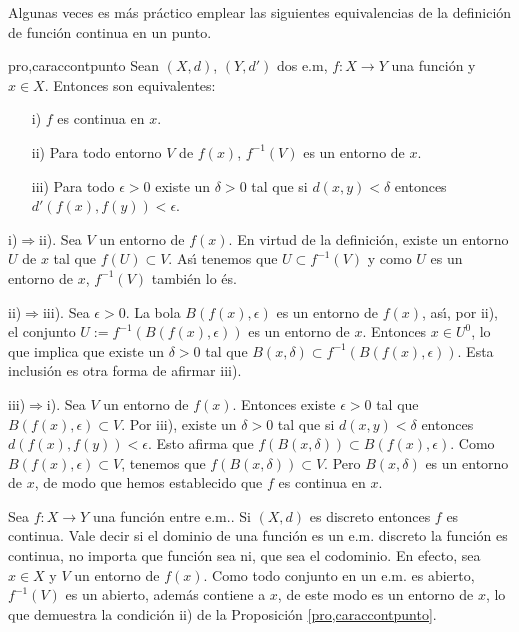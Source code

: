 Algunas veces es más práctico emplear las siguientes
equivalencias de la definición de función continua en un
punto.

\begin{proposicion}{pro,caraccontpunto} Sean $(X,d)$, $(Y,d')$ dos e.m, $f:X\rightarrow
Y$ una función y $x\in X$. Entonces son equivalentes:
\begin{itemize}
\item[i)] $f$ es continua en $x$.
\item[ii)] Para todo entorno $V$ de $f(x)$, $f^{-1}(V)$ es un
entorno de $x$.
\item[iii)]Para todo $\epsilon>0$ existe un $\delta>0$ tal que
si $d(x,y)<\delta$ entonces  $d'(f(x),f(y))<\epsilon$.
\end{itemize}
\end{proposicion}
\begin{demo} i)$\Rightarrow$ii). Sea $V$ un entorno  de $f(x)$.
En virtud de la definición, existe un entorno $U$ de $x$ tal que
$f(U)\subset V$. As\'{\i} tenemos que $U\subset f^{-1}(V)$ y como
$U$ es un entorno de $x$, $f^{-1}(V)$ también lo és.

ii)$\Rightarrow$iii). Sea $\epsilon>0$. La bola $B(f(x),\epsilon)$
es un entorno de $f(x)$, as\'{\i}, por ii), el conjunto
$U:=f^{-1}(B(f(x),\epsilon))$ es un entorno de $x$. Entonces $x\in
U^0$, lo que implica que existe un $\delta>0$ tal que
$B(x,\delta)\subset f^{-1}(B(f(x),\epsilon))$. Esta inclusión es
otra forma de afirmar iii).

iii)$\Rightarrow$i). Sea $V$ un entorno de $f(x)$. Entonces existe
$\epsilon>0$ tal que $B(f(x),\epsilon)\subset V$. Por iii), existe
un $\delta>0$ tal que si $d(x,y)<\delta$ entonces
$d(f(x),f(y))<\epsilon$. Esto afirma que $f(B(x,\delta))\subset
B(f(x),\epsilon)$. Como $B(f(x),\epsilon)\subset V$, tenemos que
$f(B(x,\delta))\subset V$. Pero $B(x,\delta)$ es un entorno de
$x$, de modo que hemos establecido que $f$ es continua en $x$.
\end{demo}
\begin{ejemplo}{} Sea $f:X\rightarrow Y$ una función entre
e.m.. Si $(X,d)$ es discreto entonces $f$ es continua. Vale decir
si el dominio de una función es un e.m. discreto la función es
continua, no importa que función sea ni, que sea el codominio.
En efecto, sea $x\in X$ y $V$ un entorno de $f(x)$. Como todo
conjunto en un e.m. es abierto, $f^{-1}(V)$ es un abierto,
además contiene a $x$, de este modo es un entorno de $x$, lo que
demuestra la condición ii) de la Proposición
\vref{pro,caraccontpunto}.
\end{ejemplo}

